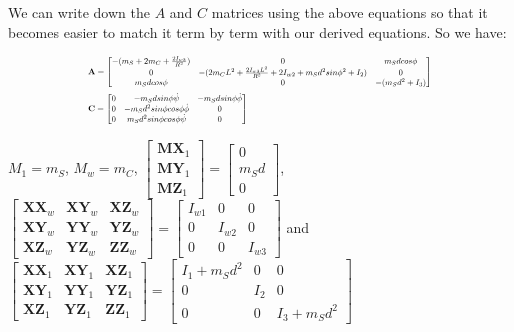 \documentclass[a4paper,10pt]{article}
\newcommand\scalemath[2]{\scalebox{#1}{\mbox{\ensuremath{\displaystyle #2}}}}
\begin{document}
We can write down the $A$ and $C$ matrices using the above equations so that it becomes easier to match it 
term by term with our derived equations. So we have:

\begin{align} \begin{split}
 &\scalemath{0.595}{\mathbf{A} = \left[ \begin{matrix} -(m_S + 2m_C + \frac{2I_{w3}}{R^2}) & 0 & m_Sdcos\phi \\ 
   0 & -(2m_CL^2 +\frac{2I_{w3}L^2}{R^2} + 2I_{w2} + m_Sd^2sin\phi^2 + I_2 ) & 0 \\
   m_Sdcos\phi & 0  & -(m_Sd^2 + I_3) \end{matrix} \right]} \\
 &\scalemath{0.595}{\mathbf{C} = \left[ \begin{matrix} 0 & - m_Sdsin\phi\dot{\psi} & - m_Sdsin\phi\dot{\phi} \\ 
     0 & - m_Sd^2sin\phi cos\phi\dot{\phi} & 0 \\ 
    0 & m_Sd^2sin\phi cos\phi\dot{\psi} & 0 \end{matrix} \right]} 
\end{split} \end{align}


\tiny{
$M_1 = m_S$, $M_w = m_C$, $\left[\begin{matrix} \mathbf{MX}_1 \\ \mathbf{MY}_1 \\ \mathbf{MZ}_1 \end{matrix}\right] = \left[\begin{matrix} 0 \\ m_Sd \\ 0\end{matrix}\right]$, 
$\left[\begin{matrix} \mathbf{XX}_w & \mathbf{XY}_w & \mathbf{XZ}_w \\ \mathbf{XY}_w & \mathbf{YY}_w & \mathbf{YZ}_w \\ \mathbf{XZ}_w & \mathbf{YZ}_w & \mathbf{ZZ}_w \end{matrix}\right] 
= \left[\begin{matrix} I_{w1} & 0 & 0 \\ 0 & I_{w2} & 0 \\ 0 & 0 & I_{w3} \end{matrix}\right]$ and
$\left[\begin{matrix} \mathbf{XX}_1 & \mathbf{XY}_1 & \mathbf{XZ}_1 \\ \mathbf{XY}_1 & \mathbf{YY}_1 & \mathbf{YZ}_1 \\ \mathbf{XZ}_1 & \mathbf{YZ}_1 & \mathbf{ZZ}_1 \end{matrix}\right] 
= \left[\begin{matrix} I_1+m_Sd^2 & 0 & 0 \\ 0 & I_2 & 0 \\ 0 & 0 & I_3+m_Sd^2 \end{matrix}\right]$}
\end{document}
